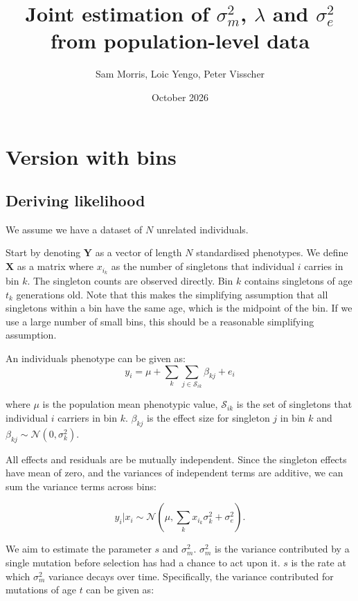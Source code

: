 \documentclass{article}
\title{Joint estimation of $\sigma_{m}^{2}$, $\lambda$ and $\sigma_{e}^{2}$ from population-level data}
\author{Sam Morris, Loic Yengo, Peter Visscher}
\date{October 2026}
\begin{document}
\maketitle

\section{Version with bins}

\subsection{Deriving likelihood}

We assume we have a dataset of $N$ unrelated individuals.

Start by denoting $\boldsymbol{Y}$ as a vector of length $N$ standardised phenotypes. We define $\boldsymbol{X}$ as a matrix where $x_{i_k}$ as the number of singletons that individual $i$ carries in bin $k$. The singleton counts are observed directly. Bin $k$ contains singletons of age $t_k$ generations old. Note that this makes the simplifying assumption that all singletons within a bin have the same age, which is the midpoint of the bin. If we use a large number of small bins, this should be a reasonable simplifying assumption.

An individuals phenotype can be given as:
\begin{equation}
    y_{i} = \mu + \sum_{k} \sum_{j \in \mathcal{S}_{ik}} \beta_{kj} + e_i
\end{equation}

where $\mu$ is the population mean phenotypic value, $\mathcal{S}_{ik}$ is the set of singletons that individual $i$ carriers in bin $k$. $\beta_{kj}$ is the effect size for singleton $j$ in bin $k$ and $\beta_{kj} \sim \mathcal{N}(0, \sigma_k^2)$.

All effects and residuals are be mutually independent. Since the singleton effects have mean of zero, and the variances of independent terms are additive, we can sum the variance terms across bins:

\begin{equation}
    y_{i} | x_{i} \sim \mathcal{N}( \mu, \sum_{k} x_{i_k} \sigma_{k}^{2} + \sigma_{e}^{2}).
    \label{eq:conditional}
\end{equation}

We aim to estimate the parameter $s$ and $\sigma_{m}^2$. $\sigma_{m}^2$ is the variance contributed by a single mutation before selection has had a chance to act upon it. $s$ is the rate at which $\sigma_{m}^2$ variance decays over time. Specifically, the variance contributed for mutations of age $t$ can be given as:
\end{document}
